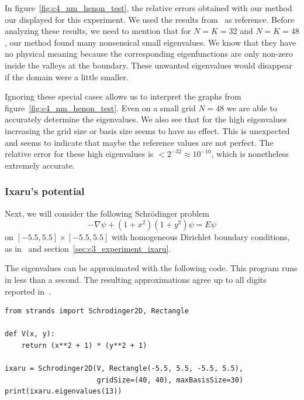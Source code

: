 In figure~\ref{fig:c4_nm_henon_test}, the relative errors obtained with our method our displayed for this experiment. We used the results from~\cite{wang_new_2009} as reference. Before analyzing these results, we need to mention that for $N = K = 32$ and $N = K = 48$, our method found many nonsensical small eigenvalues. We know that they have no physical meaning because the corresponding eigenfunctions are only non-zero inside the valleys at the boundary. These unwanted eigenvalues would disappear if the domain were a little smaller.

Ignoring these special cases allows us to interpret the graphs from figure~\ref{fig:c4_nm_henon_test}. Even on a small grid $N = 48$ we are able to accurately determine the eigenvalues. We also see that for the high eigenvalues increasing the grid size or basis size seems to have no effect. This is unexpected and seems to indicate that maybe the reference values are not perfect. The relative error for these high eigenvalues is $< 2^{-32} \approx 10^{-10}$, which is nonetheless extremely accurate.

\subsubsection{Ixaru's potential}\label{sec:c4_numerical_ixaru}

Next, we will consider the following Schrödinger problem
$$
    -\nabla \psi + (1+x^2)(1+y^2) \psi = E\psi
$$
on $[-5.5, 5.5]\times [-5.5, 5.5]$ with homogeneous Dirichlet boundary conditions, as in~\cite{ixaru_new_2010} and section~\ref{sec:c3_experiment_ixaru}.

The eigenvalues can be approximated with the following code. This program runs in less than a second. The resulting approximations agree up to all digits reported in~\cite{ixaru_new_2010}.


\begin{verbatim}
from strands import Schrodinger2D, Rectangle

def V(x, y):
    return (x**2 + 1) * (y**2 + 1)

ixaru = Schrodinger2D(V, Rectangle(-5.5, 5.5, -5.5, 5.5),
                      gridSize=(40, 40), maxBasisSize=30)
print(ixaru.eigenvalues(13))
\end{verbatim}


